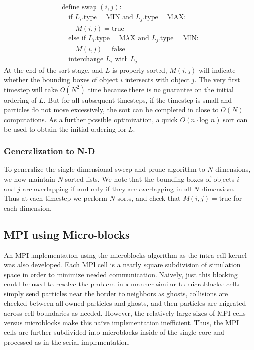 \documentclass[11pt]{article} %
\begin{document}
\[
\begin{aligned} & \text{define swap }(i,j):\\
 & \quad\text{if }L_{i}\text{.type}=\text{MIN and }L_{j}\text{.type}=\text{MAX}:\\
 & \quad\quad M(i,j)=\text{true}\\
 & \quad\text{else if }L_{i}\text{.type}=\text{MAX and }L_{j}\text{.type}=\text{MIN}:\\
 & \quad\quad M(i,j)=\text{false}\\
 & \quad\text{interchange }L_{i}\text{ with }L_{j}
\end{aligned}
\]
At the end of the sort stage, and $L$ is properly sorted, $M(i,j)$
will indicate whether the bounding boxes of object $i$ intersects
with object $j$. The very first timestep will take $O(N^{2})$ time
because there is no guarantee on the initial ordering of $L$. But
for all subsequent timesteps, if the timestep is small and particles
do not move excessively, the sort can be completed in close to $O(N)$
computations. As a further possible optimization, a quick $O(n\cdot\text{log }n)$
sort can be used to obtain the initial ordering for $L$. 

\subsubsection{Generalization to N-D}

To generalize the single dimensional sweep and prune algorithm to
$N$ dimensions, we now maintain $N$ sorted lists. We note that the
bounding boxes of objects $i$ and $j$ are overlapping if and only
if they are overlapping in all $N$ dimensions. Thus at each timestep
we perform $N$ sorts, and check that $M(i,j)=\text{true}$ for each
dimension. 

\subsection{MPI using Micro-blocks}

An MPI implementation using the microblocks algorithm as the intra-cell kernel was also developed. Each MPI cell is a nearly square subdivision of simulation space in order to minimize needed communication. Naively, just this blocking could be used to resolve the problem in a manner similar to microblocks: cells simply send particles near the border to neighbors as ghosts, collisions are checked between all owned particles and ghosts, and then particles are migrated across cell boundaries as needed. However, the relatively large sizes of MPI cells versus microblocks make this naïve implementation inefficient. Thus, the MPI cells are further subdivided into microblocks inside of the single core and processed as in the serial implementation.
\end{document}
